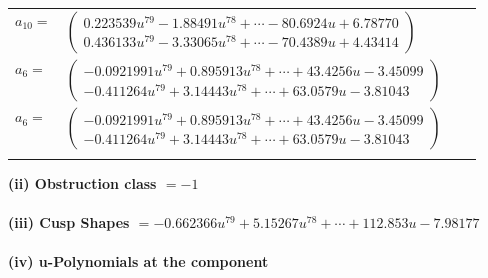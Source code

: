 \documentclass[1p]{elsarticle_modified}
\theoremstyle{definition}
\begin{document}
\begin{tabular}{m{7pt} m{180pt} m{7pt} m{180pt} }
\flushright $a_{10}=$&$\begin{pmatrix}0.223539 u^{79}-1.88491 u^{78}+\cdots-80.6924 u+6.78770\\0.436133 u^{79}-3.33065 u^{78}+\cdots-70.4389 u+4.43414\end{pmatrix}$ \\
\flushright $a_{6}=$&$\begin{pmatrix}-0.0921991 u^{79}+0.895913 u^{78}+\cdots+43.4256 u-3.45099\\-0.411264 u^{79}+3.14443 u^{78}+\cdots+63.0579 u-3.81043\end{pmatrix}$\\ \flushright $a_{6}=$&$\begin{pmatrix}-0.0921991 u^{79}+0.895913 u^{78}+\cdots+43.4256 u-3.45099\\-0.411264 u^{79}+3.14443 u^{78}+\cdots+63.0579 u-3.81043\end{pmatrix}$\\&\end{tabular}
\flushleft \textbf{(ii) Obstruction class $= -1$}\\~\\
\flushleft \textbf{(iii) Cusp Shapes $= -0.662366 u^{79}+5.15267 u^{78}+\cdots+112.853 u-7.98177$}\\~\\
\newpage\renewcommand{\arraystretch}{1}
\flushleft \textbf{(iv) u-Polynomials at the component}\newline \\
\end{document}

